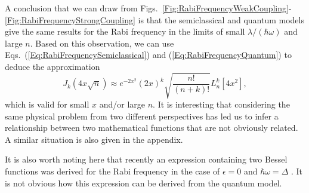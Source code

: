 \documentclass[aps,twocolumn,superscriptaddress]{revtex4}
\begin{document}
A conclusion that we can draw from Figs.~\ref{Fig:RabiFrequencyWeakCoupling}-\ref{Fig:RabiFrequencyStrongCoupling} is that the semiclassical and quantum models give the same results for the Rabi frequency in the limits of small $\lambda/(\hbar\omega)$ and large $n$. Based on this observation, we can use Eqs.~(\ref{Eq:RabiFrequencySemiclassical}) and (\ref{Eq:RabiFrequencyQuantum}) to deduce the approximation
%
\begin{equation}
J_k\left(4x\sqrt{n}\right) \approx e^{-2x^2} \left(2x\right)^k \sqrt{\frac{n!}{(n+k)!}} L_{n}^{k}\left[4x^2\right],
\end{equation}
%
which is valid for small $x$ and/or large $n$. It is interesting that considering the same physical problem from two different perspectives has led us to infer a relationship between two mathematical functions that are not obviously related. A similar situation is also given in the appendix.

It is also worth noting here that recently an expression containing two Bessel functions was derived for the Rabi frequency in the case of $\epsilon=0$ and $\hbar\omega=\Delta$ \cite{Deng,Lu}. It is not obvious how this expression can be derived from the quantum model.
\end{document}
